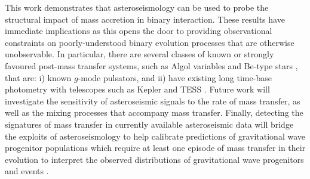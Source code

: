 \documentclass[twocolumn, twocolappendix, oneside]{aastex631}
\makeatletter
\newcommand{\unit}[1]{%
    \,\mathrm{#1}\checknextarg}
\newcommand{\checknextarg}{\@ifnextchar\bgroup{\gobblenextarg}{}}
\newcommand{\gobblenextarg}[1]{\,\mathrm{#1}\@ifnextchar\bgroup{\gobblenextarg}{}}
\newcommand{\gmode}{$g$-mode\xspace}
\newif\ifstartedinmathmode
\newcommand{\msun}{%
  \relax\ifmmode\startedinmathmodetrue\else\startedinmathmodefalse\fi
  {\ifstartedinmathmode\unit{M_{\odot}}\else$\unit{M_{\odot}}$\fi}\xspace%
}
\newif\ifstartedinmathmode
\makeatother
\begin{document}

This work demonstrates that asteroseismology can be used to probe the structural impact of mass accretion in binary interaction. These results have immediate implications as this opens the door to providing observational constraints on poorly-understood binary evolution processes that are otherwise unobservable. In particular, there are several classes of known or strongly favoured post-mass transfer systems, such as Algol variables \citep[e.g. ][]{Shi2022} and Be-type stars \citep[e.g.][]{Baade1982,Bodensteiner+2020,LabadieBartz2022}, that are: i) known \gmode pulsators, and ii) have existing long time-base photometry with telescopes such as Kepler \citep{Borucki+2010} and TESS \citep{Ricker+2015}. Future work will investigate the sensitivity of asteroseismic signals to the rate of mass transfer, as well as the mixing processes that accompany mass transfer. Finally, detecting the signatures of mass transfer in currently available asteroseismic data will bridge the exploits of asteroseismology to help calibrate predictions of gravitational wave progenitor populations which require at least one episode of mass transfer in their evolution to interpret the observed distributions of gravitational wave progenitors and events \citep{Abbott+2023,Renzo+2023}.
\end{document}
